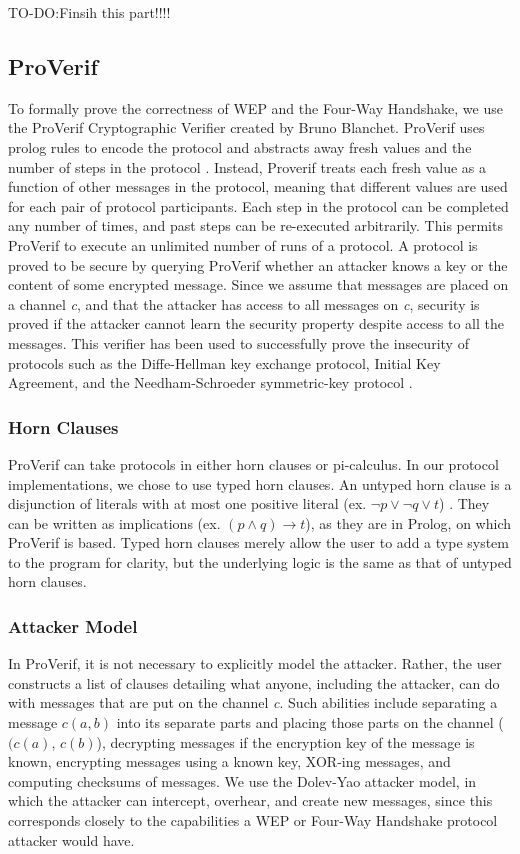 \documentclass[11pt, twocolumn]{article} %
\begin{document}
TO-DO:Finsih this part!!!!

\subsection{ProVerif}
To formally prove the correctness of WEP and the Four-Way Handshake, we use the ProVerif Cryptographic Verifier created by Bruno Blanchet.  ProVerif uses prolog rules to encode the protocol and abstracts away fresh values and the number of steps in the protocol \cite{blanchet01}.  Instead, Proverif treats each fresh value as a function of other messages in the protocol, meaning that different values are used for each pair of protocol participants.  Each step in the protocol can be completed any number of times, and past steps can be re-executed arbitrarily.  This permits ProVerif to execute an unlimited number of runs of a protocol.  A protocol is proved to be secure by querying ProVerif whether an attacker knows a key or the content of some encrypted message. Since we assume that messages are placed on a channel \textit{c}, and that the attacker has access to all messages on \textit{c}, security is proved if the attacker cannot learn the security property despite access to all the messages. This verifier has been used to successfully prove the insecurity of protocols such as the Diffe-Hellman key exchange protocol, Initial Key Agreement, and the Needham-Schroeder symmetric-key protocol \cite{lafourcade10, abadi}.

\subsubsection{Horn Clauses}
ProVerif can take protocols in either horn clauses or pi-calculus.  In our protocol implementations, we chose to use typed horn clauses.  An untyped horn clause is a disjunction of literals with at most one positive literal (ex. $ \neg p \lor \neg q \lor t$) \cite{blanchet09}.  They can be written as implications (ex. $(p \land q ) \rightarrow t$), as they are in Prolog, on which ProVerif is based. Typed horn clauses merely allow the user to add a type system to the program for clarity, but the underlying logic is the same as that of untyped horn clauses.

\subsubsection{Attacker Model}
In ProVerif, it is not necessary to explicitly model the attacker.  Rather, the user constructs a list of clauses detailing what anyone, including the attacker, can do with messages that are put on the channel \textit{c}.  Such abilities include separating a message $c(a,b)$ into its separate parts and placing those parts on the channel ($(c(a)$, $c(b)$), decrypting messages if the encryption key of the message is known, encrypting messages using a known key, XOR-ing messages, and computing checksums of messages.  We use the Dolev-Yao attacker model, in which the attacker can intercept, overhear, and create new messages, since this corresponds closely to the capabilities a WEP or Four-Way Handshake protocol attacker would have.
\end{document}

